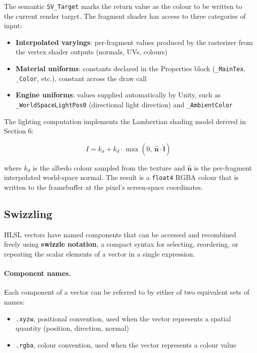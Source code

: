 \documentclass[11pt]{article}
\begin{document}
The semantic \texttt{SV\_Target} marks the return value as the colour to be written to the current render target. The fragment shader has access to three categories of input:

\begin{itemize}
    \item \textbf{Interpolated varyings}: per-fragment values produced by the rasterizer from the vertex shader outputs (normals, UVs, colours)
    \item \textbf{Material uniforms}: constants declared in the Properties block (\texttt{\_MainTex}, \texttt{\_Color}, etc.), constant across the draw call
    \item \textbf{Engine uniforms}: values supplied automatically by Unity, such as \texttt{\_WorldSpaceLightPos0} (directional light direction) and \texttt{\_AmbientColor}
\end{itemize}

The lighting computation implements the Lambertian shading model derived in Section 6:

\begin{equation}
    I = k_a + k_d \cdot \max(0,\, \hat{\mathbf{n}} \cdot \hat{\mathbf{l}})
\end{equation}

where $k_d$ is the albedo colour sampled from the texture and $\hat{\mathbf{n}}$ is the per-fragment interpolated world-space normal. The result is a \texttt{float4} RGBA colour that is written to the framebuffer at the pixel's screen-space coordinates.


\subsection{Swizzling}

HLSL vectors have named components that can be accessed and recombined freely using \textbf{swizzle notation}, a compact syntax for selecting, reordering, or repeating the scalar elements of a vector in a single expression.

\paragraph{Component names.} Each component of a vector can be referred to by either of two equivalent sets of names:

\begin{itemize}
    \item \texttt{.xyzw}, positional convention, used when the vector represents a spatial quantity (position, direction, normal)
    \item \texttt{.rgba}, colour convention, used when the vector represents a colour value
\end{itemize}
\end{document}
